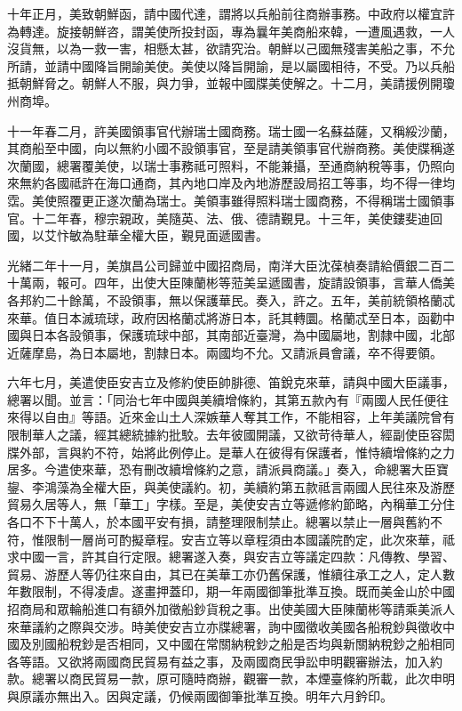 \begin{pinyinscope}
十年正月，美致朝鮮函，請中國代達，謂將以兵船前往商辦事務。中政府以權宜許為轉達。旋接朝鮮咨，謂美使所投封函，專為曩年美商船來韓，一遭風遇救，一人沒貨無，以為一救一害，相懸太甚，欲請究治。朝鮮以己國無殘害美船之事，不允所請，並請中國降旨開諭美使。美使以降旨開諭，是以屬國相待，不受。乃以兵船抵朝鮮脅之。朝鮮人不服，與力爭，並報中國牒美使解之。十二月，美請援例開瓊州商埠。

十一年春二月，許美國領事官代辦瑞士國商務。瑞士國一名蘇益薩，又稱綏沙蘭，其商船至中國，向以無約小國不設領事官，至是請美領事官代辦商務。美使牒稱遂次蘭國，總署覆美使，以瑞士事務祗可照料，不能兼攝，至通商納稅等事，仍照向來無約各國祗許在海口通商，其內地口岸及內地游歷設局招工等事，均不得一律均霑。美使照覆更正遂次蘭為瑞士。美領事雖得照料瑞士國商務，不得稱瑞士國領事官。十二年春，穆宗親政，美隨英、法、俄、德請覲見。十三年，美使鏤斐迪回國，以艾忭敏為駐華全權大臣，覲見面遞國書。

光緒二年十一月，美旗昌公司歸並中國招商局，南洋大臣沈葆楨奏請給價銀二百二十萬兩，報可。四年，出使大臣陳蘭彬等蒞美呈遞國書，旋請設領事，言華人僑美各邦約二十餘萬，不設領事，無以保護華民。奏入，許之。五年，美前統領格蘭忒來華。值日本滅琉球，政府因格蘭忒將游日本，託其轉圜。格蘭忒至日本，函勸中國與日本各設領事，保護琉球中部，其南部近臺灣，為中國屬地，割隸中國，北部近薩摩島，為日本屬地，割隸日本。兩國均不允。又請派員會議，卒不得要領。

六年七月，美遣使臣安吉立及修約使臣帥腓德、笛銳克來華，請與中國大臣議事，總署以聞。並言：「同治七年中國與美續增條約，其第五款內有『兩國人民任便往來得以自由』等語。近來金山土人深嫉華人奪其工作，不能相容，上年美議院曾有限制華人之議，經其總統據約批駮。去年彼國開議，又欲苛待華人，經副使臣容閎牒外部，言與約不符，始將此例停止。是華人在彼得有保護者，惟恃續增條約之力居多。今遣使來華，恐有刪改續增條約之意，請派員商議。」奏入，命總署大臣寶鋆、李鴻藻為全權大臣，與美使議約。初，美續約第五款祗言兩國人民往來及游歷貿易久居等人，無「華工」字樣。至是，美使安吉立等遞修約節略，內稱華工分住各口不下十萬人，於本國平安有損，請整理限制禁止。總署以禁止一層與舊約不符，惟限制一層尚可酌擬章程。安吉立等以章程須由本國議院酌定，此次來華，祗求中國一言，許其自行定限。總署遂入奏，與安吉立等議定四款：凡傳教、學習、貿易、游歷人等仍往來自由，其已在美華工亦仍舊保護，惟續往承工之人，定人數年數限制，不得凌虐。遂畫押蓋印，期一年兩國御筆批準互換。既而美金山於中國招商局和眾輪船進口有額外加徵船鈔貨稅之事。出使美國大臣陳蘭彬等請乘美派人來華議約之際與交涉。時美使安吉立亦牒總署，詢中國徵收美國各船稅鈔與徵收中國及別國船稅鈔是否相同，又中國在常關納稅鈔之船是否均與新關納稅鈔之船相同各等語。又欲將兩國商民貿易有益之事，及兩國商民爭訟申明觀審辦法，加入約款。總署以商民貿易一款，原可隨時商辦，觀審一款，本煙臺條約所載，此次申明與原議亦無出入。因與定議，仍候兩國御筆批準互換。明年六月鈐印。


\end{pinyinscope}
